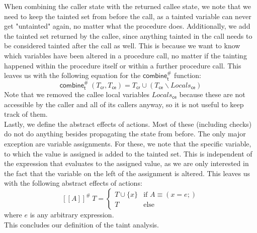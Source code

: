       When combining the caller state with the returned callee state, we note that we need to keep the tainted set from before the call, as a tainted variable can never get "untainted" again, no matter what the procedure does. Additionally, we add the tainted set returned by the callee, since anything tainted in the call needs to be considered tainted after the call as well. This is because we want to know which variables have been altered in a procedure call, no matter if the tainting happened within the procedure itself or within a further procedure call. This leaves us with the following equation for the $\textsf{combine}^{\#}_\textsf{t}$ function:
      \[ \textsf{combine}^{\#}_\textsf{t}\ (T_\textsf{cr}, T_\textsf{ce}) = T_\textsf{cr} \cup (T_\textsf{ce} \backslash Locals_\textsf{ce}) \]
      Note that we removed the callee local variables $Locals_\textsf{ce}$ because these are not accessible by the caller and all of its callers anyway, so it is not useful to keep track of them.\\
      Lastly, we define the abstract effects of actions. Most of these (including checks) do not do anything besides propagating the state from before. The only major exception are variable assignments. For these, we note that the specific variable, to which the value is assigned is added to the tainted set. This is independent of the expression that evaluates to the assigned value, as we are only interested in the fact that the variable on the left of the assignment is altered. This leaves us with the following abstract effects of actions:
      \[ [\![ A ]\!] ^{\#}\ T = \left\{ \begin{array}{ll}
        T \cup \{x\} & \text{if }A \equiv (x = e;)\\
        T & \text{else}
      \end{array} \right. \]
      where $e$ is any arbitrary expression.\\
      This concludes our definition of the taint analysis.

